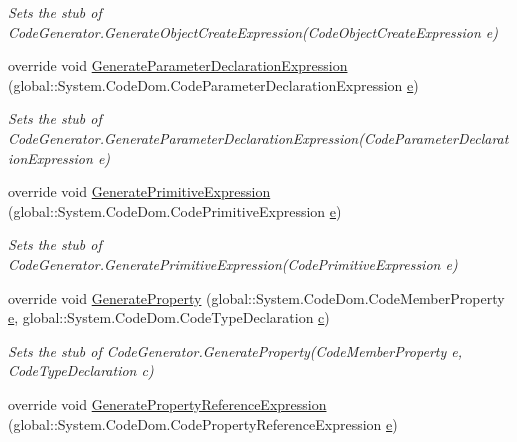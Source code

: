 \begin{DoxyCompactItemize}
\begin{DoxyCompactList}\small\item\em Sets the stub of Code\-Generator.\-Generate\-Object\-Create\-Expression(\-Code\-Object\-Create\-Expression e)\end{DoxyCompactList}\item 
override void \hyperlink{class_system_1_1_code_dom_1_1_compiler_1_1_fakes_1_1_stub_code_generator_ab94f4ddebd15a8518c97b3d90b37b650}{Generate\-Parameter\-Declaration\-Expression} (global\-::\-System.\-Code\-Dom.\-Code\-Parameter\-Declaration\-Expression \hyperlink{jquery-1_810_82_8min_8js_a2c038346d47955cbe2cb91e338edd7e1}{e})
\begin{DoxyCompactList}\small\item\em Sets the stub of Code\-Generator.\-Generate\-Parameter\-Declaration\-Expression(\-Code\-Parameter\-Declaration\-Expression e)\end{DoxyCompactList}\item 
override void \hyperlink{class_system_1_1_code_dom_1_1_compiler_1_1_fakes_1_1_stub_code_generator_ae07b2ff567d6df82efb6dd6ed9c8f797}{Generate\-Primitive\-Expression} (global\-::\-System.\-Code\-Dom.\-Code\-Primitive\-Expression \hyperlink{jquery-1_810_82_8min_8js_a2c038346d47955cbe2cb91e338edd7e1}{e})
\begin{DoxyCompactList}\small\item\em Sets the stub of Code\-Generator.\-Generate\-Primitive\-Expression(\-Code\-Primitive\-Expression e)\end{DoxyCompactList}\item 
override void \hyperlink{class_system_1_1_code_dom_1_1_compiler_1_1_fakes_1_1_stub_code_generator_af2c288752ec5957c6340053c82fe5aae}{Generate\-Property} (global\-::\-System.\-Code\-Dom.\-Code\-Member\-Property \hyperlink{jquery-1_810_82_8min_8js_a2c038346d47955cbe2cb91e338edd7e1}{e}, global\-::\-System.\-Code\-Dom.\-Code\-Type\-Declaration \hyperlink{bootstrap_8min_8js_abce695e0af988ece0826d9ad59b8160d}{c})
\begin{DoxyCompactList}\small\item\em Sets the stub of Code\-Generator.\-Generate\-Property(\-Code\-Member\-Property e, Code\-Type\-Declaration c)\end{DoxyCompactList}\item 
override void \hyperlink{class_system_1_1_code_dom_1_1_compiler_1_1_fakes_1_1_stub_code_generator_adaf85daffc3b3700eee5cdff38a3a587}{Generate\-Property\-Reference\-Expression} (global\-::\-System.\-Code\-Dom.\-Code\-Property\-Reference\-Expression \hyperlink{jquery-1_810_82_8min_8js_a2c038346d47955cbe2cb91e338edd7e1}{e})

\end{DoxyCompactItemize}
